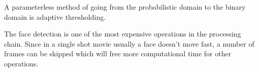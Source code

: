 A parameterless method of going from the probabilistic domain to the binary domain is adaptive thresholding.

The face detection is one of the most expensive operations in the processing chain. Since in a single shot movie usually a face doesn't move fast, a number of frames can be skipped which will free more computational time for other operations.

\begin{figure}[htbp]
\begin{center}
\hspace{0.03\linewidth}
\hspace{0.03\linewidth}
\hspace{0.03\linewidth}

\end{center}
\end{figure}
